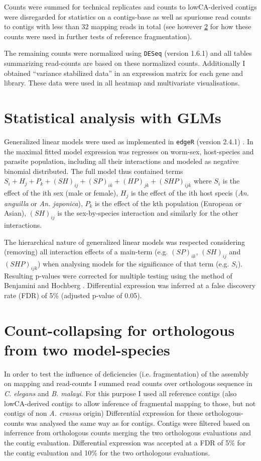 Counts were summed for technical replicates and counts to
lowCA-derived contigs were disregarded for statistics on a
contigs-base as well as spuriouse read counts to contigs with less
than 32 mapping reads in total (see however \ref{collapse} for how
these counts were used in further tests of reference fragmentation).

The remaining counts were normalized using \texttt{DESeq} (version
1.6.1) and all tables summarizing read-counts are based on these
normalized counts. Additionally I obtained ``variance stabilized
data'' in an expression matrix for each gene and library. These data
were used in all heatmap and multivariate visualisations.

\section{Statistical analysis with GLMs}

Generalized linear models were used as implemented in \texttt{edgeR}
(version 2.4.1) \cite{pmid19910308}. In the maximal fitted model
expression was regresses on worm-sex, host-species and parasite
population, including all their interactions and modeled as negative
binomial distributed. The full model thus contained terms $ S_i + H_j
+ P_k + (SH)_{ij} + (SP)_{ik} + (HP)_{jk} + (SHP)_{ijk}$ where $S_i$
is the effect of the ith sex (male or female), $H_j$ is the effect of
the ith host specis (\textit{An. anguilla} or \textit{An. japonica}),
$P_k$ is the effect of the kth population (European or Asian),
$(SH)_{ij}$ is the sex-by-species interaction and similarly for the
other interactions.

The hierarchical nature of generalized linear models was respected
considering (removing) all interaction effects of a main-term
(e.g. $(SP)_{ik}$, $(SH)_{ij}$ and $(SHP)_{ijk}$) when analysing
models for the significance of that term (e.g. $S_i$). Resulting
p-values were corrected for multiple testing using the method of
Benjamini and Hochberg \cite{benjamini1995controlling}. Differential
expression was inferred at a false discovery rate (FDR) of 5\%
(adjusted p-value of 0.05).

\section{Count-collapsing for orthologous from two model-species}
\label{collapse}

In order to test the influence of deficiencies (i.e. fragmentation) of
the assembly on mapping and read-counts I summed read counts over
orthologous sequence in \textit{C. elegans} and
\textit{B. malayi}. For this purpose I used all reference contigs
(also lowCA-derived contigs to allow inference of fragmental mapping
to those, but not contigs of non \textit{A. crassus} origin)
Differential expression for these orthologous-counts was analysed the
same way as for contigs. Contigs were filtered based on inferrence
from orthologous counts merging the two orthologous evaluations and
the contig evaluation. Differential expression was accepted at a FDR
of 5\% for the contig evaluation and 10\% for the two orthologous
evaluations.


